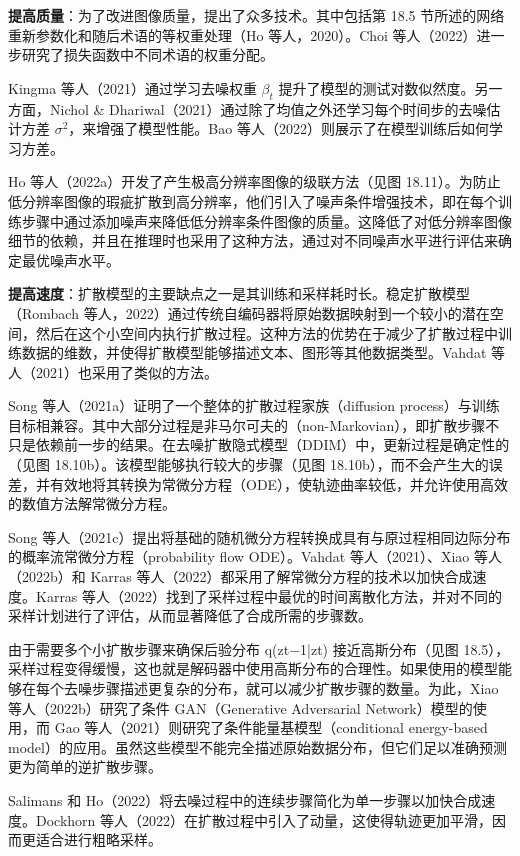 \textbf{提高质量}：为了改进图像质量，提出了众多技术。其中包括第 18.5 节所述的网络重新参数化和随后术语的等权重处理（Ho 等人，2020）。Choi 等人（2022）进一步研究了损失函数中不同术语的权重分配。

Kingma 等人（2021）通过学习去噪权重 \(\beta_t\) 提升了模型的测试对数似然度。另一方面，Nichol \& Dhariwal（2021）通过除了均值之外还学习每个时间步的去噪估计方差 \(\sigma^2\)，来增强了模型性能。Bao 等人（2022）则展示了在模型训练后如何学习方差。

Ho 等人（2022a）开发了产生极高分辨率图像的级联方法（见图 18.11）。为防止低分辨率图像的瑕疵扩散到高分辨率，他们引入了噪声条件增强技术，即在每个训练步骤中通过添加噪声来降低低分辨率条件图像的质量。这降低了对低分辨率图像细节的依赖，并且在推理时也采用了这种方法，通过对不同噪声水平进行评估来确定最优噪声水平。

\textbf{提高速度}：扩散模型的主要缺点之一是其训练和采样耗时长。稳定扩散模型（Rombach 等人，2022）通过传统自编码器将原始数据映射到一个较小的潜在空间，然后在这个小空间内执行扩散过程。这种方法的优势在于减少了扩散过程中训练数据的维数，并使得扩散模型能够描述文本、图形等其他数据类型。Vahdat 等人（2021）也采用了类似的方法。

Song 等人（2021a）证明了一个整体的扩散过程家族（diffusion process）与训练目标相兼容。其中大部分过程是非马尔可夫的（non-Markovian），即扩散步骤不只是依赖前一步的结果。在去噪扩散隐式模型（DDIM）中，更新过程是确定性的（见图 18.10b）。该模型能够执行较大的步骤（见图 18.10b），而不会产生大的误差，并有效地将其转换为常微分方程（ODE），使轨迹曲率较低，并允许使用高效的数值方法解常微分方程。

Song 等人（2021c）提出将基础的随机微分方程转换成具有与原过程相同边际分布的概率流常微分方程（probability flow ODE）。Vahdat 等人（2021）、Xiao 等人（2022b）和 Karras 等人（2022）都采用了解常微分方程的技术以加快合成速度。Karras 等人（2022）找到了采样过程中最优的时间离散化方法，并对不同的采样计划进行了评估，从而显著降低了合成所需的步骤数。

由于需要多个小扩散步骤来确保后验分布 q(zt−1|zt) 接近高斯分布（见图 18.5），采样过程变得缓慢，这也就是解码器中使用高斯分布的合理性。如果使用的模型能够在每个去噪步骤描述更复杂的分布，就可以减少扩散步骤的数量。为此，Xiao 等人（2022b）研究了条件 GAN（Generative Adversarial Network）模型的使用，而 Gao 等人（2021）则研究了条件能量基模型（conditional energy-based model）的应用。虽然这些模型不能完全描述原始数据分布，但它们足以准确预测更为简单的逆扩散步骤。

Salimans 和 Ho（2022）将去噪过程中的连续步骤简化为单一步骤以加快合成速度。Dockhorn 等人（2022）在扩散过程中引入了动量，这使得轨迹更加平滑，因而更适合进行粗略采样。

